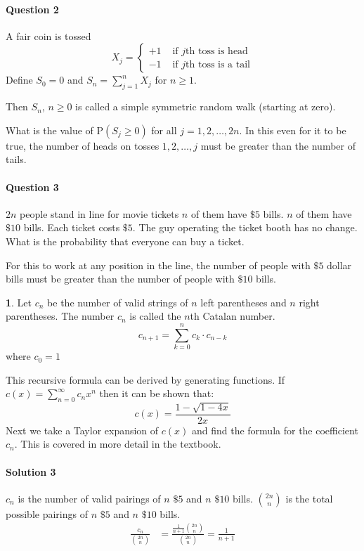 \documentclass[english,12pt]{article}
\theoremstyle{plain}
\theoremstyle{definition}
\newtheorem*{definition}{\protect\definitionname}
\theoremstyle{definition} %
\newcommand{\defn}[1]{\begin{definition} #1 \end{definition} }
\providecommand{\definitionname}{Definition}
\begin{document}
\paragraph{Question 2}
A fair coin is tossed
\[X_j=\begin{cases}
+1 & \text{ if }j\text{th toss is head}\\
-1 & \text{ if }j\text{th toss is a tail}
\end{cases}\]
Define $S_0=0$ and $S_n=\sum\limits_{j=1}^nX_j$ for $n\ge 1$.

Then $S_n$, $n\ge 0$ is called a simple symmetric random walk (starting at zero).

What is the value of $\text{P}(S_j\ge 0)$ for all $j=1,2,\ldots,2n$.  In this even for it to be true, the number of heads on tosses $1,2,\ldots,j$ must be greater than the number of tails.

\paragraph{Question 3}
$2n$ people stand in line for movie tickets $n$ of them have $\$5$ bills.  $n$ of them have $\$10$ bills.  Each ticket costs $\$5$.  The guy operating the ticket booth has no change.  What is the probability that everyone can buy a ticket.

For this to work at any position in the line, the number of people with $\$5$ dollar bills must be greater than the number of people with $\$10$ bills.

\defn{
Let $c_n$ be the number of valid strings of $n$ left parentheses and $n$ right parentheses.  The number $c_n$ is called the $n$th Catalan number.
\[c_{n+1}=\sum\limits_{k=0}^nc_k\cdot c_{n-k}\]
where $c_0=1$
}

This recursive formula can be derived by generating functions.  If $c(x)=\sum\limits_{n=0}^\infty c_nx^n$ then it can be shown that:
\[c(x)=\frac{1-\sqrt{1-4x}}{2x}\]
Next we take a Taylor expansion of $c(x)$ and find the formula for the coefficient $c_n$.  This is covered in more detail in the textbook.

\paragraph{Solution 3}
$c_n$ is the number of valid pairings of $n$ $\$5$ and $n$ $\$10$ bills.  ${2n\choose n}$ is the total possible pairings of $n$ $\$5$ and $n$ $\$10$ bills.
\begin{align*}
\frac{c_n}{{2n\choose n}}
&=\frac{\frac{1}{n+1}{2n\choose n}}{{2n\choose n}}
=\frac{1}{n+1}
\end{align*}
\end{document}

